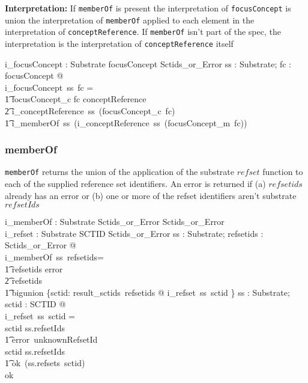 \documentclass{article}
\def\spec#1{{\tt #1}}
\begin{document}
\textbf{Interpretation:}  If  \spec{memberOf} is present the interpretation of  \spec{focusConcept} is union the interpretation of \spec{memberOf} applied to
each element in the interpretation of \spec{conceptReference}.  If \spec{memberOf} isn't part of the spec, the interpretation is the interpretation of \spec{conceptReference} itself

\begin{gendef}
   i\_focusConcept : Substrate \fun focusConcept \fun Sctids\_or\_Error
\where
   \forall ss : Substrate; fc : focusConcept @ \\
i\_focusConcept~ss~fc = \\
\t1 \IF focusConcept\_c \inv fc \in conceptReference \\
\t2 \THEN i\_conceptReference~ss~(focusConcept\_c~\inv fc) \\
\t1 \ELSE  i\_memberOf~ss~(i\_conceptReference~ss~(focusConcept\_m~\inv fc)) 
\end{gendef}

\subsubsection{memberOf}
\spec{memberOf} returns the union of the application of the substrate $refset$ function to each of the supplied reference set identifiers.  An error is
returned if (a) $refsetids$ already has an error or (b) one or more of the refset identifiers aren't substrate $refsetIds$

\begin{gendef}
   i\_memberOf : Substrate \fun Sctids\_or\_Error \fun Sctids\_or\_Error \\
   i\_refset : Substrate \fun SCTID \fun Sctids\_or\_Error
\where
   \forall ss : Substrate; refsetids : Sctids\_or\_Error @ \\
i\_memberOf~ss~refsetids= \\
\t1 \IF refsetids \in \ran error \\
\t2 \THEN refsetids \\
\t1 \ELSE bigunion \{sctid: result\_sctids~refsetids @ i\_refset~ss~sctid \} 
\also
  \forall ss : Substrate; sctid : SCTID @ \\
i\_refset~ss~sctid = \\
\IF sctid \notin ss.refsetIds \\
\t1 \THEN error~unknownRefsetId \\
\ELSE \IF sctid \in \dom ss.refsetIds \\
\t1 \THEN ok~(ss.refsets~sctid) \\
 \ELSE ok~\emptyset
\end{gendef}
\end{document}
